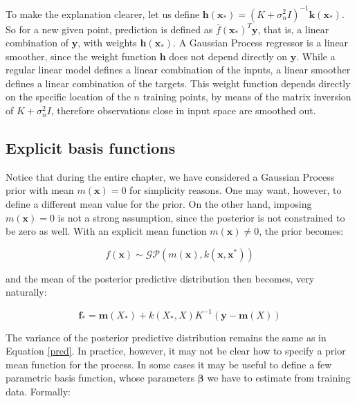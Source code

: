 \documentclass[10pt,a4paper,twoside]{book}
\begin{document}
To make the explanation clearer, let us define $\boldsymbol{h}(\boldsymbol{x}_*) = (K + \sigma_n^2 I)^{-1}\boldsymbol{k}(\boldsymbol{x}_*)$. So for a new given point, prediction is defined as $\overline{f}(\boldsymbol{x}_*)^T \boldsymbol{y}$, that is, a linear combination of $\boldsymbol{y}$, with weights $\boldsymbol{h}(\boldsymbol{x}_*)$. A Gaussian Process regressor is a linear smoother, since the weight function $\boldsymbol{h}$ does not depend directly on $\boldsymbol{y}$. While a regular linear model defines a linear combination of the inputs, a linear smoother defines a linear combination of the targets. This weight function depends directly on the specific location of the $n$ training points, by means of the matrix inversion of $K + \sigma_n^2 I$, therefore observations close in input space are smoothed out.

\subsection{Explicit basis functions}

Notice that during the entire chapter, we have considered a Gaussian Process prior with mean $m(\boldsymbol{x}) = 0$ for simplicity reasons. One may want, however, to define a different mean value for the prior. On the other hand, imposing $m(\boldsymbol{x}) = 0$ is not a strong assumption, since the posterior is not constrained to be zero as well. With an explicit mean function $m(\boldsymbol{x}) \neq 0$, the prior becomes:

\begin{equation}
f(\boldsymbol{x}) \sim \mathcal{G}\mathcal{P}\left(m(\boldsymbol{x}), k(\boldsymbol{x}, \boldsymbol{x^*})\right)
\end{equation}

and the mean of the posterior predictive distribution then becomes, very naturally:

\begin{equation}
\boldsymbol{f}_* = \boldsymbol{m}(X_*) + k(X_*, X)K^{-1}\left(\boldsymbol{y} - \boldsymbol{m}(X)\right) 
\end{equation}

The variance of the posterior predictive distribution remains the same as in Equation \ref{pred}. In practice, however, it may not be clear how to specify a prior mean function for the process. In some cases it may be useful to define a few parametric basis function, whose parameters $\boldsymbol{\beta}$ we have to estimate from training data. Formally:
\end{document}
